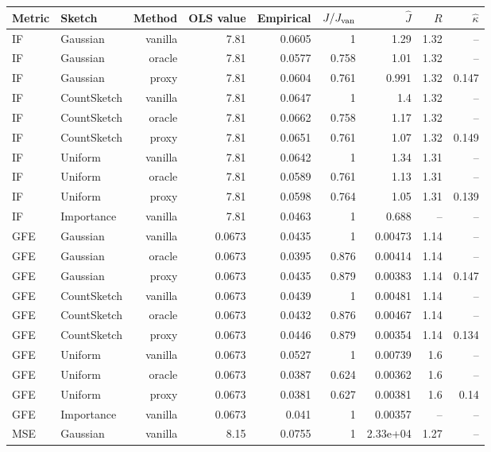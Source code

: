 \begin{table}[t]
\centering
\small
\begin{tabular}{llrrrrrrr}
\toprule
Metric & Sketch & Method & OLS value & Empirical & $J/J_{\rm van}$ & $\hat J$ & $R$ & $\hat\kappa$ \\
\midrule
IF & Gaussian & vanilla & 7.81 & 0.0605 & 1 & 1.29 & 1.32 & -- \\
IF & Gaussian & oracle & 7.81 & 0.0577 & 0.758 & 1.01 & 1.32 & -- \\
IF & Gaussian & proxy & 7.81 & 0.0604 & 0.761 & 0.991 & 1.32 & 0.147 \\
IF & CountSketch & vanilla & 7.81 & 0.0647 & 1 & 1.4 & 1.32 & -- \\
IF & CountSketch & oracle & 7.81 & 0.0662 & 0.758 & 1.17 & 1.32 & -- \\
IF & CountSketch & proxy & 7.81 & 0.0651 & 0.761 & 1.07 & 1.32 & 0.149 \\
IF & Uniform & vanilla & 7.81 & 0.0642 & 1 & 1.34 & 1.31 & -- \\
IF & Uniform & oracle & 7.81 & 0.0589 & 0.761 & 1.13 & 1.31 & -- \\
IF & Uniform & proxy & 7.81 & 0.0598 & 0.764 & 1.05 & 1.31 & 0.139 \\
IF & Importance & vanilla & 7.81 & 0.0463 & 1 & 0.688 & -- & -- \\
\midrule
GFE & Gaussian & vanilla & 0.0673 & 0.0435 & 1 & 0.00473 & 1.14 & -- \\
GFE & Gaussian & oracle & 0.0673 & 0.0395 & 0.876 & 0.00414 & 1.14 & -- \\
GFE & Gaussian & proxy & 0.0673 & 0.0435 & 0.879 & 0.00383 & 1.14 & 0.147 \\
GFE & CountSketch & vanilla & 0.0673 & 0.0439 & 1 & 0.00481 & 1.14 & -- \\
GFE & CountSketch & oracle & 0.0673 & 0.0432 & 0.876 & 0.00467 & 1.14 & -- \\
GFE & CountSketch & proxy & 0.0673 & 0.0446 & 0.879 & 0.00354 & 1.14 & 0.134 \\
GFE & Uniform & vanilla & 0.0673 & 0.0527 & 1 & 0.00739 & 1.6 & -- \\
GFE & Uniform & oracle & 0.0673 & 0.0387 & 0.624 & 0.00362 & 1.6 & -- \\
GFE & Uniform & proxy & 0.0673 & 0.0381 & 0.627 & 0.00381 & 1.6 & 0.14 \\
GFE & Importance & vanilla & 0.0673 & 0.041 & 1 & 0.00357 & -- & -- \\
\midrule
MSE & Gaussian & vanilla & 8.15 & 0.0755 & 1 & 2.33e+04 & 1.27 & -- \\

\end{tabular}
\end{table}

